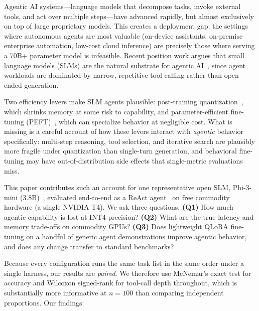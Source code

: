 \documentclass{article}
\begin{document}
Agentic AI systems---language models that decompose tasks, invoke external
tools, and act over multiple steps---have advanced rapidly, but almost
exclusively on top of large proprietary models. This creates a deployment
gap: the settings where autonomous agents are most valuable (on-device
assistants, on-premise enterprise automation, low-cost cloud inference)
are precisely those where serving a 70B+ parameter model is infeasible.
Recent position work argues that small language models (SLMs) are the
natural substrate for agentic AI~\cite{belcak2025slm}, since agent
workloads are dominated by narrow, repetitive tool-calling rather than
open-ended generation.

Two efficiency levers make SLM agents plausible: post-training
quantization~\cite{dettmers2023qlora,dettmers2022llmint8}, which shrinks
memory at some risk to capability, and parameter-efficient fine-tuning
(PEFT)~\cite{hu2022lora,dettmers2023qlora}, which can specialize behavior
at negligible cost. What is missing is a careful account of how these
levers interact with \emph{agentic} behavior specifically: multi-step
reasoning, tool selection, and iterative search are plausibly more
fragile under quantization than single-turn generation, and behavioral
fine-tuning may have out-of-distribution side effects that single-metric
evaluations miss.

This paper contributes such an account for one representative open SLM,
Phi-3-mini (3.8B)~\cite{abdin2024phi3}, evaluated end-to-end as a ReAct
agent~\cite{yao2023react} on free commodity hardware (a single NVIDIA
T4). We ask three questions. \textbf{(Q1)} How much agentic capability
is lost at INT4 precision? \textbf{(Q2)} What are the true latency and
memory trade-offs on commodity GPUs? \textbf{(Q3)} Does lightweight QLoRA
fine-tuning on a handful of generic agent demonstrations improve agentic
behavior, and does any change transfer to standard benchmarks?

Because every configuration runs the same task list in the same order
under a single harness, our results are \emph{paired}. We therefore use
McNemar's exact test for accuracy and Wilcoxon signed-rank for tool-call
depth throughout, which is substantially more informative at $n{=}100$
than comparing independent proportions. Our findings:
\end{document}
